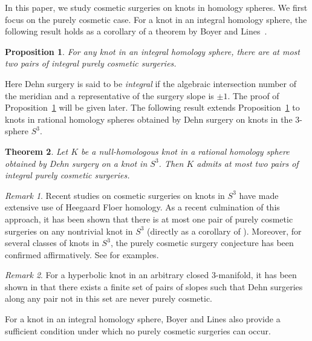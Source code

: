 \documentclass{amsart}
\newtheorem{theorem}{Theorem}
\newtheorem{proposition}[theorem]{Proposition}
\theoremstyle{remark}
\newtheorem{remark}{Remark}
\begin{document}
In this paper, we study cosmetic surgeries on knots in homology spheres.
We first focus on the purely cosmetic case.
For a knot in an integral homology sphere, the following result holds as a corollary of a theorem by Boyer and Lines~\cite[Theorem 2.8]{BoyerLines}.

\begin{proposition}\label{prop:BL1}
   For any knot in an integral homology sphere, there are at most two pairs of integral purely cosmetic surgeries. 
\end{proposition}

Here Dehn surgery is said to be \emph{integral} if the algebraic intersection number of the meridian and a representative of the surgery slope is $\pm 1$. 
The proof of Proposition~\ref{prop:BL1} will be given later. 
The following result extends Proposition~\ref{prop:BL1} to knots in rational homology spheres obtained by Dehn surgery on knots in the 3-sphere $S^3$. 

\begin{theorem}\label{thm:rational}
    Let $K$ be a null-homologous knot in a rational homology sphere obtained by Dehn surgery on a knot in $S^3$. 
     Then $K$ admits at most two pairs of integral purely cosmetic surgeries. 
\end{theorem}

\begin{remark}
Recent studies on cosmetic surgeries on knots in $S^3$ have made extensive use of Heegaard Floer homology. 
As a recent culmination of this approach, it has been shown that there is at most one pair of purely cosmetic surgeries on any nontrivial knot in $S^3$ (directly as a corollary of \cite[Corollary 1.4]{daemi2024filteredinstantonhomologycosmetic}). 
Moreover, for several classes of knots in $S^3$, the purely cosmetic surgery conjecture has been confirmed affirmatively.
See \cite{daemi2024filteredinstantonhomologycosmetic,IchiharaJongMattmanSaito,KotelskiyLidmanMooreWatsonZibrowius,StipsiczSzabo,TaoComposite,Varvarezos21} for examples.
\end{remark}


\begin{remark}
For a hyperbolic knot in an arbitrary closed 3-manifold, it has been shown in \cite[Theorem 1.13]{FPS22} that there exists a finite set of pairs of slopes such that Dehn surgeries along any pair not in this set are never purely cosmetic. 
\end{remark}


For a knot in an integral homology sphere, Boyer and Lines also provide a sufficient condition under which no purely cosmetic surgeries can occur.
\end{document}
